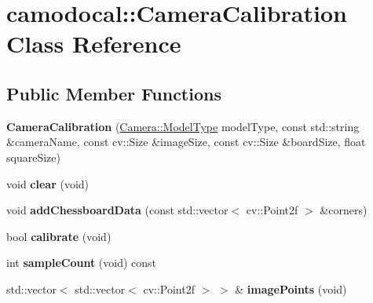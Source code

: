 \hypertarget{classcamodocal_1_1CameraCalibration}{}\section{camodocal\+:\+:Camera\+Calibration Class Reference}
\label{classcamodocal_1_1CameraCalibration}
\subsection*{Public Member Functions}
\begin{DoxyCompactItemize}
\item 
\mbox{\label{classcamodocal_1_1CameraCalibration_aeadd443792485a4d6590ea02e4ce3557}} 
{\bfseries Camera\+Calibration} (\hyperlink{classcamodocal_1_1Camera_a663bb19b7b1f38f6d1b7eeb0890183ff}{Camera\+::\+Model\+Type} model\+Type, const std\+::string \&camera\+Name, const cv\+::\+Size \&image\+Size, const cv\+::\+Size \&board\+Size, float square\+Size)
\item 
\mbox{\label{classcamodocal_1_1CameraCalibration_a07e5e523c16159536c92cade483a64bd}} 
void {\bfseries clear} (void)
\item 
\mbox{\label{classcamodocal_1_1CameraCalibration_a41ab885dc75b4c23e8bef62af89573b2}} 
void {\bfseries add\+Chessboard\+Data} (const std\+::vector$<$ cv\+::\+Point2f $>$ \&corners)
\item 
\mbox{\label{classcamodocal_1_1CameraCalibration_af0638fb51c1e633814403a6be89f45fe}} 
bool {\bfseries calibrate} (void)
\item 
\mbox{\label{classcamodocal_1_1CameraCalibration_ab840e8335fc0e281b75269a14321c2df}} 
int {\bfseries sample\+Count} (void) const
\item 
\mbox{\label{classcamodocal_1_1CameraCalibration_a1559248803a3d8fe4bfefb34d209e77e}} 
std\+::vector$<$ std\+::vector$<$ cv\+::\+Point2f $>$ $>$ \& {\bfseries image\+Points} (void)
\item 
\mbox{\label{classcamodocal_1_1CameraCalibration_a7b89b69c893486fda5f3f0cd75c1d053}} 

\end{DoxyCompactItemize}
